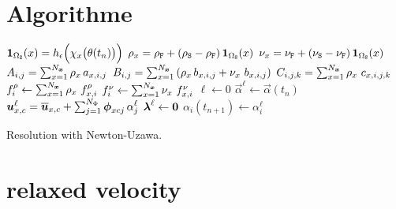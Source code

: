 \documentclass[10pt,a4paper]{article}
\begin{document}
\section{Algorithme}
\begin{algorithm}[H]
$\boldsymbol 1_{\Omega_{\mathtt{S}}}(x)= h_{\epsilon}\Big(\chi_x\big(\theta(t_{n})\big)\Big)$\;
$\rho_x = \rho_{\mathtt{F}} + (\rho_{\mathtt{S}}-\rho_{\mathtt{F}})\,\boldsymbol 1_{\Omega_{\mathtt{S}}}(x)$ \;
$\nu_x = \nu_{\mathtt{F}} + (\nu_{\mathtt{S}}-\nu_{\mathtt{F}})\,\boldsymbol 1_{\Omega_{\mathtt{S}}}(x)$ \;
$A_{i,j} = \sum_{x=1}^{N_{\boldsymbol{x}}}\rho_x\,a_{x, i,j}$ \;
$B_{i,j} = \sum_{x=1}^{N_{\boldsymbol{x}}}\left(\rho_x\,b_{x,i,j}+\nu_x\,\,b_{x, i,j}\right)$ \;
$C_{i,j,k} = \sum_{x=1}^{N_{\boldsymbol{x}}}\rho_x\,\,c_{x, i,j,k}$ \;
$f^\rho_{i} \leftarrow \sum_{x=1}^{N_{\boldsymbol{x}}}\rho_x\,\,f^\rho_{x, i}$\;
$f^\nu_{i} \leftarrow \sum_{x=1}^{N_{\boldsymbol{x}}}\nu_x\,\,f^\nu_{x, i}$\;
\;
$\ell\leftarrow 0$\;
$\vec\alpha ^{\ell} \leftarrow \vec \alpha (t_{n})$\;
$\boldsymbol{u}^{\ell}_{x, c} = \overline{\boldsymbol{u}}_{x, c}+\sum_{j=1}^{N_\Phi}\boldsymbol{\phi}_{xcj}\,\alpha_j^{\ell} $\;
$\boldsymbol{\lambda}^{\ell} \leftarrow \boldsymbol{0}$\; 
$\alpha_i(t_{n+1}) \leftarrow \alpha_i^{\ell}$\;
 \caption{Resolution with Newton-Uzawa.}
\end{algorithm}

\section{relaxed velocity}
\end{document}
